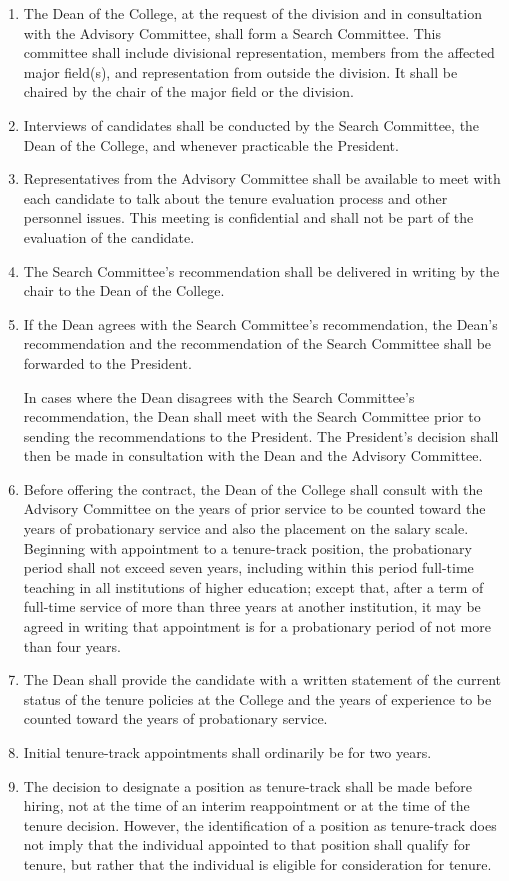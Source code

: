 \documentclass{manual}
\newcommand{\itemLevelA}{\alph*.}
\newcommand{\itemRefA}{\alph*}
\begin{document}
	\begin{enumerate}[label=\itemLevelA,ref=\itemRefA]
	\item The Dean of the College, at the request of the division and in consultation with the Advisory Committee, shall form a Search Committee. This committee shall include divisional representation, members from the affected major field(s), and representation from outside the division. It shall be chaired by the chair of the major field or the division.
	\item Interviews of candidates shall be conducted by the Search Committee, the Dean of the College, and whenever practicable the President.
	\item Representatives from the Advisory Committee shall be available to meet with each candidate to talk about the tenure evaluation process and other personnel issues. This meeting is confidential and shall not be part of the evaluation of the candidate.
	\item The Search Committee's recommendation shall be delivered in writing by the chair to the Dean of the College.
	\item If the Dean agrees with the Search Committee's recommendation, the Dean's recommendation and the recommendation of the Search Committee shall be forwarded to the President.

		In cases where the Dean disagrees with the Search Committee's recommendation, the Dean shall meet with the Search Committee prior to sending the recommendations to the President. The President's decision shall then be made in consultation with the Dean and the Advisory Committee.
		
	\item Before offering the contract, the Dean of the College shall consult with the Advisory Committee on the years of prior service to be counted toward the years of probationary service and also the placement on the salary scale. Beginning with appointment to a tenure-track position, the probationary period shall not exceed seven years, including within this period full-time teaching in all institutions of higher education; except that, after a term of full-time service of more than three years at another institution, it may be agreed in writing that appointment is for a probationary period of not more than four years.
	\item The Dean shall provide the candidate with a written statement of the current status of the tenure policies at the College and the years of experience to be counted toward the years of probationary service.
	\item Initial tenure-track appointments shall ordinarily be for two years.
	\item The decision to designate a position as tenure-track shall be made before hiring, not at the time of an interim reappointment or at the time of the tenure decision. However, the identification of a position as tenure-track does not imply that the individual appointed to that position shall qualify for tenure, but rather that the individual is eligible for consideration for tenure.
	\end{enumerate}
\end{document}

